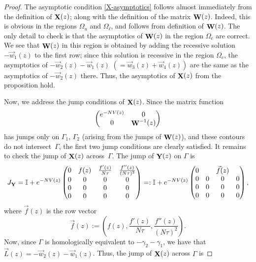 \documentclass[10pt,a4paper]{amsart}
\DeclareMathOperator{\WW}{{\bf W}}
\DeclareMathOperator{\XX}{{\bf X}}
\DeclareMathOperator{\YY}{{\bf Y}}
\begin{document}
\begin{proof}
 The asymptotic condition \eqref{X-asymptotics} follows almost immediately from the definition of $\XX(z)$; along with the definition of the matrix $\WW(z)$. Indeed, this is obvious in the regions $\Omega_u$ and $\Omega_\ell$, and follows from definition of $\WW(z)$. The only detail to check
 is that the asymptotics of $\WW(z)$ in the region $\Omega_c$ are correct. We see that $\WW(z)$ in this region is obtained by adding the recessive solution $-\vec{w}_1(z)$
 to the first row; since this solution is recessive in the region $\Omega_c$, the asymptotics of $-\vec{w}_2(z) - \vec{w}_1(z)$ $(= \vec{w}_3(z)+ \vec{w}_4(z))$ are the same as the
 asymptotics of $-\vec{w}_2(z)$ there. Thus, the asymptotics of $\XX(z)$ from the
 proposition hold.

 Now, we address the jump conditions of $\XX(z)$. Since the matrix function
 \begin{equation*}
 \begin{pmatrix}
 {\rm e}^{-NV(z)} & 0 \\
 0 & \WW^{-1}(z)
 \end{pmatrix}
 \end{equation*}
 has jumps only on $\Gamma_1$, $\Gamma_2$ (arising from the jumps of $\WW(z)$), and these contours do not intersect~$\Gamma$, the first two jump conditions are clearly satisfied. It remains to check the jump of $\XX(z)$ across~$\Gamma$. The jump of $\YY(z)$ on $\Gamma$ is
 \begin{equation*}
 J_{\YY} = \mathbb{I} +
 {\rm e}^{-NV(z)}\begin{pmatrix}
 0 & f(z) & \frac{f'(z)}{N\tau} & \frac{f''(z)}{(N\tau)^2} \\
 0 & 0 & 0 & 0 \\
 0 & 0 & 0 & 0 \\
 0 & 0 & 0 & 0
 \end{pmatrix}
 =:
 \mathbb{I} + {\rm e}^{-NV(z)} \begin{pmatrix}
 0 & & \vec{f}(z) & \\
 0 & 0 & 0 & 0 \\
 0 & 0 & 0 & 0 \\
 0 & 0 & 0 & 0
 \end{pmatrix},
 \end{equation*}
 where $\vec{f}(z)$ is the row vector
 \begin{equation*}
 \vec{f}(z) := \left(
 f(z), \frac{f'(z)}{N\tau}, \frac{f''(z)}{(N\tau)^2} \right).
 \end{equation*}
 Now, since $\Gamma$ is homologically equivalent to $-\gamma_2 - \gamma_1$, we have that $\vec{L}(z) = -\vec{w}_2(z) - \vec{w}_1(z)$. Thus, the jump of $\XX(z)$ across $\Gamma$ is

\end{proof}
\end{document}
